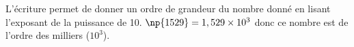\begin{Rq}
L'écriture permet de donner un ordre de grandeur du nombre donné en lisant l'exposant de la puissance de 10. $\np{1529}=1,529\times 10^3$ donc ce nombre est de l'ordre des milliers ($10^3$).
\end{Rq}

% 



